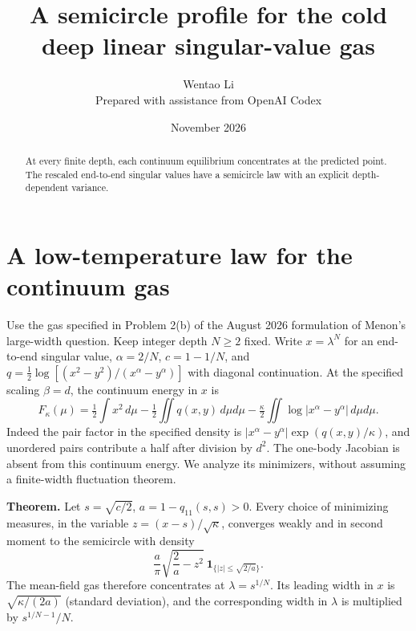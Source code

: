 \documentclass[10pt]{article}
\title{A semicircle profile for the cold deep linear singular-value gas}
\author{Wentao Li\\{\small Prepared with assistance from OpenAI Codex}}
\date{November 2026}
\begin{document}
\maketitle
\begin{abstract}
At every finite depth, each continuum equilibrium concentrates at the predicted point. The rescaled end-to-end singular values have a semicircle law with an explicit depth-dependent variance.
\end{abstract}
\section*{A low-temperature law for the continuum gas}
Use the gas specified in Problem 2(b) of the August 2026 formulation of Menon's large-width question. Keep integer depth $N\ge2$ fixed. Write $x=\lambda^N$ for an end-to-end singular value, $\alpha=2/N$, $c=1-1/N$, and $q=\frac12\log[(x^2-y^2)/(x^\alpha-y^\alpha)]$ with diagonal continuation. At the specified scaling $\beta=d$, the continuum energy in $x$ is
\[
 F_\kappa(\mu)=\tfrac12\int x^2\,d\mu-\tfrac12\iint q(x,y)\,d\mu d\mu
                  -\tfrac{\kappa}{2}\iint\log|x^\alpha-y^\alpha|\,d\mu d\mu.
\]
Indeed the pair factor in the specified density is $|x^\alpha-y^\alpha|\exp(q(x,y)/\kappa)$, and unordered pairs contribute a half after division by $d^2$. The one-body Jacobian is absent from this continuum energy. We analyze its minimizers, without assuming a finite-width fluctuation theorem.

\textbf{Theorem.} Let $s=\sqrt{c/2}$, $a=1-q_{11}(s,s)>0$. Every choice of minimizing measures, in the variable $z=(x-s)/\sqrt\kappa$, converges weakly and in second moment to the semicircle with density
\[
 \frac a\pi\sqrt{\frac2a-z^2}\ \mathbf 1_{\{|z|\le\sqrt{2/a}\}} .
\]
The mean-field gas therefore concentrates at $\lambda=s^{1/N}$. Its leading width in $x$ is $\sqrt{\kappa/(2a)}$ (standard deviation), and the corresponding width in $\lambda$ is multiplied by $s^{1/N-1}/N$.
\end{document}
